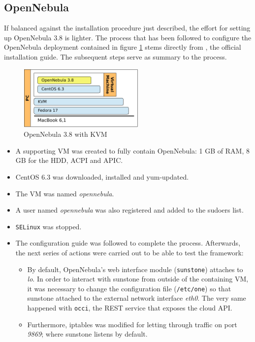 \subsection{OpenNebula}\label{subsec:opennebula}

\noindent If balanced against the installation procedure just described, the effort for setting up OpenNebula 3.8 is lighter. The process that has been followed to configure the OpenNebula deployment contained in figure \ref{fig:opennebula} stems directly from \cite{centosonquickstart}, the official installation guide. The subsequent steps serve as summary to the process.

\begin{figure}[tbp]
\begin{center}
\includegraphics[width=0.55\textwidth]{imagenes/009.pdf}
 \caption{OpenNebula 3.8 with KVM}
\label{fig:opennebula}
\end{center}
\end{figure}

\begin{itemize}
 \item A supporting VM was created to fully contain OpenNebula: 1 GB of RAM, 8 GB for the HDD, ACPI and APIC.
 \item CentOS 6.3 was downloaded, installed and yum-updated.
 \item The VM was named \emph{opennebula}.
 \item A user named \emph{opennebula} was also registered and added to the sudoers list.
 \item \texttt{SELinux} was stopped.
 \item The configuration guide \cite{centosonquickstart} was followed to complete the process. Afterwards, the next series of actions were carried out to be able to test the framework:
  \begin{itemize}
   \item By default, OpenNebula's web interface module (\texttt{sunstone}) attaches to \emph{lo}. In order to interact with sunstone from outside of the containing VM, it was necessary to change the configuration file (\texttt{/etc/one}) so that sunstone attached to the external network interface \emph{eth0}. The very same happened with \texttt{occi}, the REST service that exposes the cloud API.
   \item Furthermore, iptables was modified for letting through traffic on port \emph{9869}; where sunstone listens by default.
  \end{itemize}
\end{itemize}

